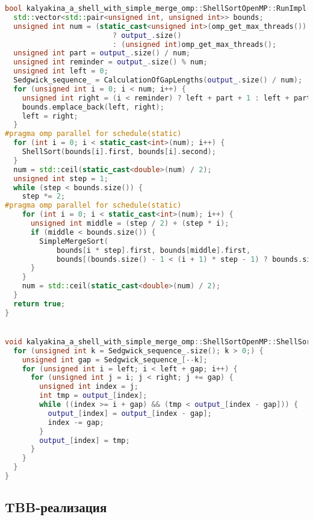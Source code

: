 \documentclass[a4paper,14pt]{extarticle}
\begin{document}
\begin{lstlisting}[language=C++]
bool kalyakina_a_shell_with_simple_merge_omp::ShellSortOpenMP::RunImpl() {
  std::vector<std::pair<unsigned int, unsigned int>> bounds;
  unsigned int num = (static_cast<unsigned int>(omp_get_max_threads()) > output_.size())
                         ? output_.size()
                         : (unsigned int)omp_get_max_threads();
  unsigned int part = output_.size() / num;
  unsigned int reminder = output_.size() % num;
  unsigned int left = 0;
  Sedgwick_sequence_ = CalculationOfGapLengths(output_.size() / num);
  for (unsigned int i = 0; i < num; i++) {
    unsigned int right = (i < reminder) ? left + part + 1 : left + part;
    bounds.emplace_back(left, right);
    left = right;
  }
#pragma omp parallel for schedule(static)
  for (int i = 0; i < static_cast<int>(num); i++) {
    ShellSort(bounds[i].first, bounds[i].second);
  }
  num = std::ceil(static_cast<double>(num) / 2);
  unsigned int step = 1;
  while (step < bounds.size()) {
    step *= 2;
#pragma omp parallel for schedule(static)
    for (int i = 0; i < static_cast<int>(num); i++) {
      unsigned int middle = (step / 2) + (step * i);
      if (middle < bounds.size()) {
        SimpleMergeSort(
            bounds[i * step].first, bounds[middle].first,
            bounds[(bounds.size() - 1 < (i + 1) * step - 1) ? bounds.size() - 1 : ((i + 1) * step) - 1].second);
      }
    }
    num = std::ceil(static_cast<double>(num) / 2);
  }
  return true;
}


void kalyakina_a_shell_with_simple_merge_omp::ShellSortOpenMP::ShellSort(unsigned int left, unsigned int right) {
  for (unsigned int k = Sedgwick_sequence_.size(); k > 0;) {
    unsigned int gap = Sedgwick_sequence_[--k];
    for (unsigned int i = left; i < left + gap; i++) {
      for (unsigned int j = i; j < right; j += gap) {
        unsigned int index = j;
        int tmp = output_[index];
        while ((index >= i + gap) && (tmp < output_[index - gap])) {
          output_[index] = output_[index - gap];
          index -= gap;
        }
        output_[index] = tmp;
      }
    }
  }
}
\end{lstlisting}

\subsection*{TBB-реализация}
\end{document}
